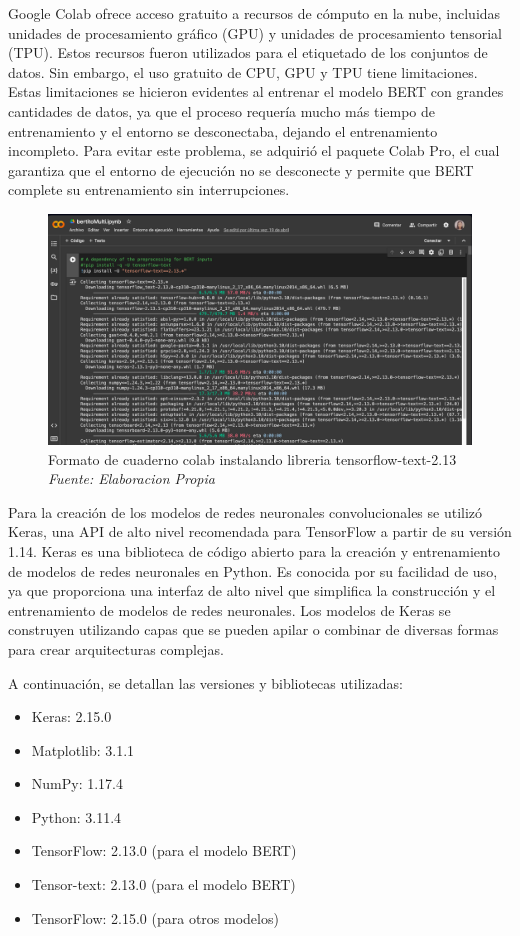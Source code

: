 Google Colab ofrece acceso gratuito a recursos de cómputo en la nube, incluidas unidades de procesamiento gráfico (GPU) y unidades de procesamiento tensorial (TPU). Estos recursos fueron utilizados para el etiquetado de los conjuntos de datos. Sin embargo, el uso gratuito de CPU, GPU y TPU tiene limitaciones. Estas limitaciones se hicieron evidentes al entrenar el modelo BERT con grandes cantidades de datos, ya que el proceso requería mucho más tiempo de entrenamiento y el entorno se desconectaba, dejando el entrenamiento incompleto. Para evitar este problema, se adquirió el paquete Colab Pro, el cual garantiza que el entorno de ejecución no se desconecte y permite que BERT complete su entrenamiento sin interrupciones.

\begin{figure}[h!]
	\includegraphics[width=1\textwidth]{capitulo5/figuras/bertito.png}
	\caption[Formato de cuaderno colab instalando libreria tensorflow-text-2.13]{Formato de cuaderno colab instalando libreria tensorflow-text-2.13
		\\\textit{Fuente: Elaboracion Propia}}
	\label{fig:bertito}
\end{figure}

Para la creación de los modelos de redes neuronales convolucionales se utilizó Keras, una API de alto nivel recomendada para TensorFlow a partir de su versión 1.14. Keras es una biblioteca de código abierto para la creación y entrenamiento de modelos de redes neuronales en Python. Es conocida por su facilidad de uso, ya que proporciona una interfaz de alto nivel que simplifica la construcción y el entrenamiento de modelos de redes neuronales. Los modelos de Keras se construyen utilizando capas que se pueden apilar o combinar de diversas formas para crear arquitecturas complejas.

A continuación, se detallan las versiones y bibliotecas utilizadas:

\begin{itemize}

\item Keras: 2.15.0
\item Matplotlib: 3.1.1
\item NumPy: 1.17.4
\item Python: 3.11.4
\item TensorFlow: 2.13.0 (para el modelo BERT)
\item Tensor-text: 2.13.0 (para el modelo BERT)
\item TensorFlow: 2.15.0 (para otros modelos)

\end{itemize}